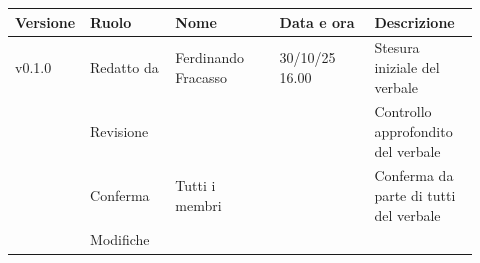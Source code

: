 \documentclass[a4paper,12pt]{article}
\begin{document}
\begin{center}
\small
\renewcommand{\arraystretch}{1.2} 
\begin{tabular}{|p{0.1\linewidth}|p{0.18\linewidth}|p{0.22\linewidth}|p{0.20\linewidth}|p{0.22\linewidth}|}
\hline
\rowcolor{gray!60} 
\textbf{Versione} & \textbf{Ruolo} & \textbf{Nome} & \textbf{Data e ora} & \textbf{Descrizione} \\
\hline
\rowcolor{white}
v0.1.0 & Redatto da & Ferdinando Fracasso & 30/10/25 16.00 & Stesura iniziale del verbale \\
\hline
\rowcolor{gray!20}
 & Revisione &  &  & Controllo approfondito del verbale \\
\hline
\rowcolor{white}
 & Conferma & Tutti i membri &  & Conferma da parte di tutti del verbale \\
\hline
\rowcolor{gray!20}
 & Modifiche &  &  &  \\
\hline
\end{tabular}
\end{center}
\end{document}
